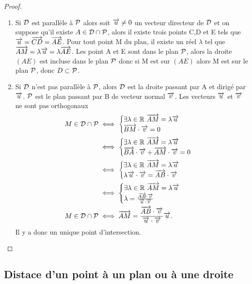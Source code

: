 \begin{proof}
  \begin{enumerate}
  \item Si \(\Dr\) est parallèle à \(\P\) alors soit \(\vu\neq 0\) un vecteur directeur de \(\Dr\) et on suppose qu'il existe \(A\in\Dr\cap\P\), alors il existe trois points C,D et E tels que \(\vu=\vect{CD}=\vect{AE}\). Pour tout point M du plan, il existe un réel \(\lambda\) tel que \(\vect{AM}=\lambda\vu=\lambda\vect{AE}\). Les point A et E sont dans le plan \(\P\), alors la droite \((AE)\) est incluse dans le plan \(\P\) donc si M est sur \((AE)\) alors M est sur le plan \(\P\), donc \(D \subset \P\).
  \item Si \(\Dr\) n'est pas parallèle à \(\P\), alors \(\Dr\) est la droite passant par A et dirigé par \(\vu\). \(\P\) est le plan passant par B de vecteur normal \(\vv\). Les vecteurs \(\vu\) et \(\vv\) ne sont pas orthogonaux
    \begin{align}
      M \in \Dr\cap\P &\iff \begin{cases} \exists \lambda \in \R \ \vect{AM}=\lambda\vu \\ \vect{BM}\cdot\vv=0\end{cases} \\
      &\iff \begin{cases} \exists \lambda \in \R \ \vect{AM}=\lambda\vu \\ \vect{BA}\cdot\vv+\vect{AM}\cdot\vv=0\end{cases}\\
      &\iff \begin{cases} \exists \lambda \in \R \ \vect{AM}=\lambda\vu \\ \lambda\vu\cdot\vv=\vect{AB}\cdot\vv\end{cases}\\
      &\iff \begin{cases} \exists \lambda \in \R \ \vect{AM}=\lambda\vu \\\lambda=\frac{\vect{AB}\cdot\vv}{\vu\cdot\vv}\end{cases}\\
      M \in \Dr\cap\P &\iff \vect{AM}=\frac{\vect{AB}\cdot\vv}{\vu\cdot\vv}\vu.
    \end{align}
Il y a donc un unique point d'intersection.
  \end{enumerate}
\end{proof}

\subsection{Distace d'un point à un plan ou à une droite}
